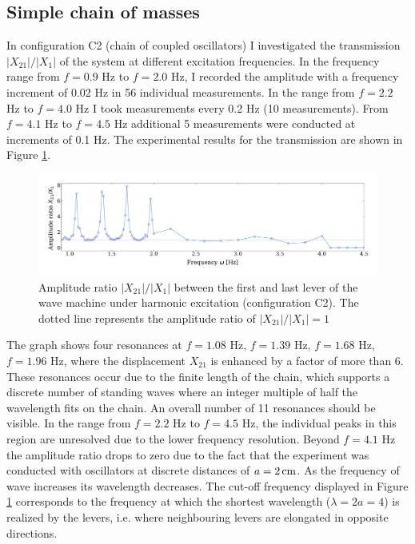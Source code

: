 \documentclass[12pt]{article}
\begin{document}
\subsection{Simple chain of masses}
In configuration C2 (chain of coupled oscillators) I investigated the transmission $|X_{21}|/|X_1|$ of the system at different excitation frequencies. In the frequency range from $f=0.9$ Hz to $f=2.0$ Hz, I recorded the amplitude with a frequency increment of 0.02 Hz in 56 individual measurements. In the range from $f=2.2$ Hz to $f=4.0$ Hz I took measurements every 0.2 Hz (10 measurements). From $f=4.1$ Hz to $f=4.5$ Hz additional 5 measurements were conducted at increments of 0.1 Hz. The experimental results for the transmission are shown in Figure \ref{fig:figure19}.
\begin{figure}[hbt]	
  \includegraphics[width=\columnwidth]{condition1_amplitude}
  \caption{Amplitude ratio $|X_{21}|/|X_1|$ between the first and last lever of the wave machine under harmonic excitation (configuration C2). The dotted line represents the amplitude ratio of  $|X_{21}|/|X_1|=1$}\label{fig:figure19}
\end{figure}
The graph shows four resonances at $f=1.08$ Hz, $f=1.39$ Hz, $f=1.68$ Hz, $f=1.96$ Hz, where the displacement $X_{21}$ is enhanced by a factor of more than 6. These resonances occur due to the finite length of the chain, which supports a discrete number of standing waves where an integer multiple of half the wavelength fits on the chain. An overall number of 11 resonances should be visible. In the range from $f=2.2$ Hz to $f=4.5$ Hz, the individual peaks in this region are unresolved due to the lower frequency resolution. Beyond $f=4.1$ Hz the amplitude ratio drops to zero due to the fact that the experiment was conducted with oscillators at discrete distances of $a=2\,{\rm cm}$. As the frequency of wave increases its wavelength decreases. The cut-off frequency displayed in Figure \ref{fig:figure19} corresponds to the frequency at which the shortest wavelength ($\lambda=2 a=4$) is realized by the levers, i.e. where neighbouring levers are elongated in opposite directions.
\end{document}
